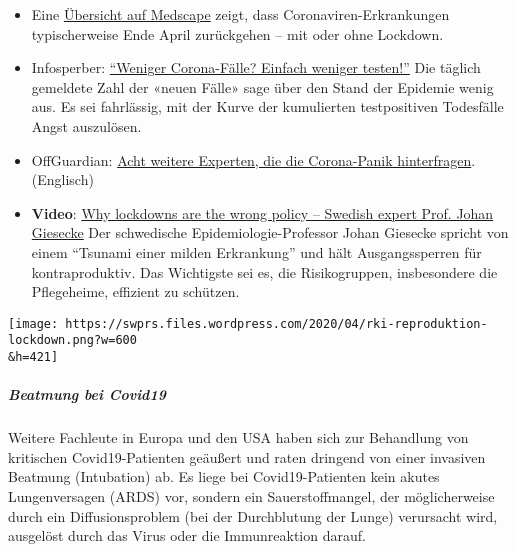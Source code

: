 \begin{itemize}
{  Zahlen rechtfertigen die Angst vor Corona nicht''}. Seine
  Erkenntnisse: „Corona ist eine vergleichsweise harmlose
  Viruserkrankung. Wir müssen uns damit beschäftigten, dass Corona eine
  normale Infektion ist, und wir müssen lernen, damit zu leben, und zwar
  ohne Quarantäne.`` Die von ihm untersuchten Todes­opfer hätten alle so
  schwere Vorerkrankungen gehabt, dass sie, „auch wenn das hart klingt,
  alle im Verlauf dieses Jahres gestorben wären``. Püschel weiter: „Die
  Zeit der Virologen ist vorbei. Wir sollten jetzt andere fragen, was in
  der Coronakrise das Richtige ist, etwa die Intensivmediziner.``
\item
  Eine
  \href{https://emedicine.medscape.com/article/227820-overview}{Übersicht
  auf Medscape} zeigt, dass Coronaviren-Erkrankungen typischerweise Ende
  April zurückgehen -- mit oder ohne Lockdown.
\item
  Infosperber:
  \href{https://www.infosperber.ch/Artikel/Gesundheit/Weniger-Corona-Falle-Einfach-weniger-testen}{``Weniger
  Corona-Fälle? Einfach weniger testen!''} Die täglich gemeldete Zahl
  der «neuen Fälle» sage über den Stand der Epidemie wenig aus. Es sei
  fahrlässig, mit der Kurve der kumulierten testpositiven Todesfälle
  Angst auszulösen.
\item
  OffGuardian:
  \href{https://off-guardian.org/2020/04/17/8-more-experts-questioning-the-coronavirus-panic/}{Acht
  weitere Experten, die die Corona-Panik hinterfragen}. (Englisch)
\item
  \textbf{Video}: \href{https://www.youtube.com/watch?v=bfN2JWifLCY}{Why
  lockdowns are the wrong policy -- Swedish expert Prof. Johan Giesecke}
  Der schwedische Epidemiologie-Professor Johan Giesecke spricht von
  einem ``Tsunami einer milden Erkrankung'' und hält Ausgangssperren für
  kontraproduktiv. Das Wichtigste sei es, die Risikogruppen,
  insbesondere die Pflegeheime, effizient zu schützen.
\end{itemize}

\texttt{[image: https://swprs.files.wordpress.com/2020/04/rki-reproduktion-lockdown.png?w=600\\\&h=421]}

\hypertarget{beatmung-bei-covid19}{%
\subparagraph{\texorpdfstring{\textbf{Beatmung bei
Covid19}}{Beatmung bei Covid19}}\label{beatmung-bei-covid19}}

Weitere Fachleute in Europa und den USA haben sich zur Behandlung von
kritischen Covid19-Patienten geäußert und raten dringend von einer
invasiven Beatmung (Intubation) ab. Es liege bei Covid19-Patienten kein
akutes Lungenversagen (ARDS) vor, sondern ein Sauerstoffmangel, der
möglicherweise durch ein Diffusionsproblem (bei der Durchblutung der
Lunge) verursacht wird, ausgelöst durch das Virus oder die Immunreaktion
darauf.

